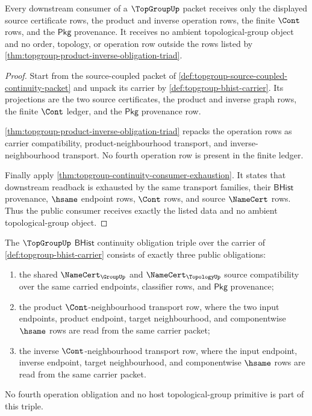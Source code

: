 \begin{theorem}
\label{thm:topgroup-public-consumer-minimality}
Every downstream consumer of a $\TopGroupUp$ packet receives only the displayed
source certificate rows, the product and inverse operation rows, the finite
$\Cont$ rows, and the $\mathsf{Pkg}$ provenance. It receives no ambient
topological-group object and no order, topology, or operation row outside the
rows listed by \autoref{thm:topgroup-product-inverse-obligation-triad}.
\end{theorem}
\begin{proof}
Start from the source-coupled packet of
\autoref{def:topgroup-source-coupled-continuity-packet} and unpack its carrier
by \autoref{def:topgroup-bhist-carrier}. Its projections are the two source
certificates, the product and inverse graph rows, the finite $\Cont$ ledger,
and the $\mathsf{Pkg}$ provenance row.

\autoref{thm:topgroup-product-inverse-obligation-triad} repacks the operation
rows as carrier compatibility, product-neighbourhood transport, and
inverse-neighbourhood transport. No fourth operation row is present in the
finite ledger.

Finally apply \autoref{thm:topgroup-continuity-consumer-exhaustion}. It states
that downstream readback is exhausted by the same transport families, their
$\mathsf{BHist}$ provenance, $\hsame$ endpoint rows, $\Cont$ rows, and source
$\NameCert$ rows. Thus the public consumer receives exactly the listed data and
no ambient topological-group object.
\end{proof}

\begin{definition}
\label{def:topgroup-bhist-continuity-obligation-triple}
The $\TopGroupUp$ $\mathsf{BHist}$ continuity obligation triple over the carrier
of \autoref{def:topgroup-bhist-carrier} consists of exactly three public
obligations:
\begin{enumerate}
\item the shared $\NameCert_{\GroupUp}$ and $\NameCert_{\TopologyUp}$ source
compatibility over the same carried endpoints, classifier rows, and
$\mathsf{Pkg}$ provenance;
\item the product $\Cont$-neighbourhood transport row, where the two input
endpoints, product endpoint, target neighbourhood, and componentwise $\hsame$
rows are read from the same carrier packet;
\item the inverse $\Cont$-neighbourhood transport row, where the input endpoint,
inverse endpoint, target neighbourhood, and componentwise $\hsame$ rows are read
from the same carrier packet.
\end{enumerate}
No fourth operation obligation and no host topological-group primitive is part
of this triple.
\end{definition}

